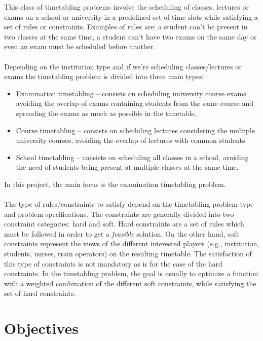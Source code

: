 This class of timetabling problems involve the scheduling of classes, lectures or exams on a school or university in a predefined set of time slots while satisfying a set of rules or constraints. Examples of rules are: a student can't be present in two classes at the same time, a student can't have two exams on the same day or even an exam must be scheduled before another.\\
\\
Depending on the institution type and if we're scheduling classes/lectures or exams the timetabling problem is divided into three main types:\\
\begin{itemize}
	\item Examination timetabling -- consists on scheduling university course exams avoiding the overlap of exams containing students from the same course and spreading the exams as much as possible in the timetable.
	\item Course timetabling -- consists on scheduling lectures considering the multiple university courses, avoiding the overlap of lectures with common students.
	\item School timetabling -- consists on scheduling all classes in a school, avoiding the need of students being present at multiple classes at the same time.
\end{itemize}
In this project, the main focus is the examination timetabling problem. \\
\\
The type of rules/constraints to satisfy depend on the timetabling problem type and problem specifications. The constraints are generally divided into two constraint categories: hard and soft. Hard constraints are a set of rules which must be followed in order to get a \textit{feasible} solution. On the other hand, soft constraints represent the views of the different interested players (e.g., institution, students, nurses, train operators) on the resulting timetable. The satisfaction of this type of constraints is not mandatory as is for the case of the hard constraints. In the timetabling problem, the goal is usually to optimize a function with a weighted combination of the different soft constraints, while satisfying the set of hard constraints. 

\section{Objectives}
\label{section:Objts}

